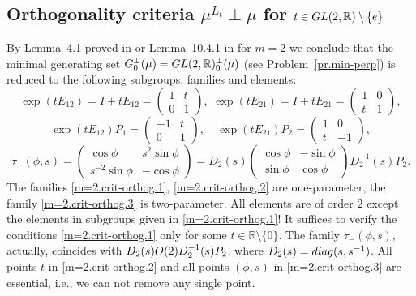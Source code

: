 \documentclass[preprint,12pt]{elsarticle}
\numberwithin{equation}{section}
\begin{document}
\subsection{Orthogonality criteria  $\mu^{L_t}\perp \mu$ for $t\in {\rm GL}(2,\mathbb R)\setminus\{e\}$}
\begin{rem}
\label{r.m=2.crit-orthog} 
By Lemma~4.1 proved in  \cite{KosJFA17} or Lemma~10.4.1 in \cite{Kos_B_09} for $m=2$ we conclude that
the minimal generating set  $G^\perp_0(\mu)={\rm GL}(2,\mathbb R)^\perp_0(\mu)$  (see Problem~\eqref{pr.min-perp})
is reduced to the following subgroups, families and elements:
%
\begin{equation}
\label{m=2.crit-orthog.1} 
\exp(tE_{12})=I+tE_{12}\!=\! \left(\begin{array}{cc}
 1&t\\
 0&1
\end{array}\right),\,\,
\exp(tE_{21})\!=\!I+tE_{21}=\left(\begin{array}{cc}
 1&0\\
 t&1
\end{array}\right),
\end{equation}
\begin{equation}
\label{m=2.crit-orthog.2} 
\exp(tE_{12})P_1= \left(\begin{array}{cc}
 -1&t\\
  0&1
\end{array}\right),\quad
\exp(tE_{21})P_2= \left(\begin{array}{cc}
 1&0\\
 t&-1
\end{array}\right),
\end{equation}
%
\begin{equation}
\label{m=2.crit-orthog.3}
\tau_{-}(\phi,s)= \left(
\begin{array}{cc}
\cos\phi&s^2\sin\phi\\
s^{-2}\sin\phi&-\cos\phi
\end{array}
\right)=
D_2(s)
\left(\begin{array}{cc}
\cos\phi&-\sin\phi\\
\sin\phi&\cos\phi
\end{array}\right)
D^{-1}_2(s)P_2. 
\end{equation}
%
The families \eqref{m=2.crit-orthog.1}, \eqref{m=2.crit-orthog.2} are one-parameter, 
the family \eqref{m=2.crit-orthog.3} is two-parameter.
All elements are of order $2$ except the elements in  subgroups given in \eqref{m=2.crit-orthog.1}!
It suffices to verify the conditions  \eqref{m=2.crit-orthog.1}  only for some $t\in \mathbb R\setminus \{0\}.$ 
The family $\tau_{-}(\phi,s)$,  
actually,  coincides with
$D_2(s){\rm O}(2)D^{-1}_2(s)P_2$, where $ D_2(s)={\rm diag}(s,s^{-1})$.
%
All points $t$ in \eqref{m=2.crit-orthog.2} and all points $(\phi,s)$ in \eqref{m=2.crit-orthog.3} are essential, i.e., we can not remove any single point.
\end{rem}
\end{document}
